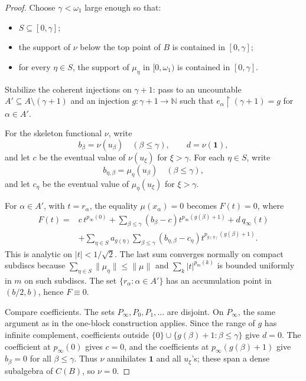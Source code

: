 \documentclass[11pt]{article}
\newcommand{\N}{\mathbb N}
\newcommand{\one}{\mathbf 1}
\begin{document}
\begin{proof}
Choose \(\gamma<\omega_1\) large enough so that:
\begin{itemize}[leftmargin=2em]
\item \(S\subseteq[0,\gamma]\);
\item the support of \(\nu\) below the top point of \(B\) is contained in
      \([0,\gamma]\);
\item for every \(\eta\in S\), the support of \(\mu_\eta\) in
      \([0,\omega_1)\) is contained in \([0,\gamma]\).
\end{itemize}
Stabilize the coherent injections on \(\gamma+1\): pass to an uncountable
\(A'\subseteq A\setminus(\gamma+1)\) and an injection \(g:\gamma+1\to\N\) such
that \(e_\alpha\!\upharpoonright(\gamma+1)=g\) for \(\alpha\in A'\).

For the skeleton functional \(\nu\), write
\[
   b_\beta=\nu(u_\beta)\quad(\beta\leq\gamma),\qquad
   d=\nu(\one),
\]
and let \(c\) be the eventual value of \(\nu(u_\xi)\) for \(\xi>\gamma\).  For
each \(\eta\in S\), write
\[
   b_{\eta,\beta}=\mu_\eta(u_\beta)\quad(\beta\leq\gamma),
\]
and let \(c_\eta\) be the eventual value of \(\mu_\eta(u_\xi)\) for
\(\xi>\gamma\).

For \(\alpha\in A'\), with \(t=r_\alpha\), the equality \(\mu(x_\alpha)=0\)
becomes \(F(t)=0\), where
\[
\begin{aligned}
F(t)=&
 c\,t^{p_\infty(0)}
 +\sum_{\beta\leq\gamma}(b_\beta-c)t^{p_\infty(g(\beta)+1)}
 +d\,q_\infty(t)\\
&+\sum_{\eta\in S} a_{g(\eta)}
   \sum_{\beta\leq\gamma}
      (b_{\eta,\beta}-c_\eta)t^{p_{g(\eta)}(g(\beta)+1)} .
\end{aligned}
\]
This is analytic on \(|t|<1/\sqrt2\).  The last sum converges normally on
compact subdiscs because \(\sum_{\eta\in S}\|\mu_\eta\|\leq\|\mu\|\) and
\(\sum_k |t|^{p_m(k)}\) is bounded uniformly in \(m\) on such subdiscs.
The set \(\{r_\alpha:\alpha\in A'\}\) has an accumulation point in
\((b/2,b)\), hence \(F\equiv0\).

Compare coefficients.  The sets \(P_\infty,P_0,P_1,\ldots\) are disjoint.
On \(P_\infty\), the same argument as in the one-block construction applies.
Since the range of \(g\) has infinite complement, coefficients outside
\(\{0\}\cup\{g(\beta)+1:\beta\leq\gamma\}\) give \(d=0\).  The coefficient at
\(p_\infty(0)\) gives \(c=0\), and the coefficients at
\(p_\infty(g(\beta)+1)\) give \(b_\beta=0\) for all \(\beta\leq\gamma\).
Thus \(\nu\) annihilates \(\one\) and all \(u_\xi\)'s; these span a dense
subalgebra of \(C(B)\), so \(\nu=0\).


\end{proof}
\end{document}
